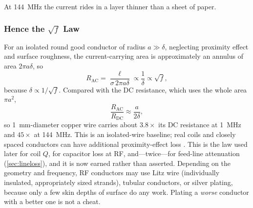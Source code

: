 At \SI{144}{\mega\hertz} the current rides in a layer thinner than a sheet of paper.

\subsubsection*{Hence the \texorpdfstring{\(\sqrt f\)}{sqrt f} Law}
For an isolated round good conductor of radius \(a\gg\delta\), neglecting
proximity effect and surface roughness, the current-carrying area is approximately
an annulus of area \(2\pi a\delta\), so
\[
R_{\mathrm{AC}}=\frac{\ell}{\sigma\,2\pi a\delta}\propto\frac{1}{\delta}\propto\sqrt f ,
\]
because \(\delta\propto1/\sqrt f\). Compared with the DC resistance, which uses the
whole area \(\pi a^2\),
\[
\frac{R_{\mathrm{AC}}}{R_{\mathrm{DC}}}\approx\frac{a}{2\delta} ,
\]
so \SI{1}{\milli\meter}-diameter copper wire carries about \(3.8\times\) its DC
resistance at \SI{1}{\mega\hertz} and \(45\times\) at \SI{144}{\mega\hertz}. This
is an isolated-wire baseline; real coils and closely spaced conductors can have
additional proximity-effect loss \cite[pp.~1--2]{bowick2008rfcircuit}. This is the
law used later for coil \(Q\), for capacitor loss at RF, and---twice---for
feed-line attenuation (\cref{sec:lineloss}), and it is now earned rather than
asserted. Depending on the geometry and frequency, RF conductors may use Litz wire
(individually insulated, appropriately sized strands), tubular conductors, or
silver plating, because only a few skin depths of surface do any work. Plating a
\emph{worse} conductor with a better one is not a cheat.

